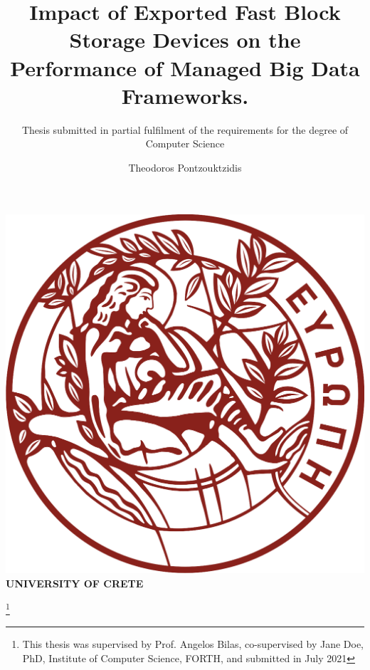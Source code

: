\documentclass[acmsmall,screen,10pt,nonacm]{acmart}
\begin{document}
\begin{center}
\includegraphics[scale=0.2]{figures/UoC_logo.png}\\
\textcolor{UoC}{\textbf{UNIVERSITY OF CRETE}}
\vspace{3em}
\end{center}

\title{Impact of Exported Fast Block Storage Devices on the Performance of Managed Big Data Frameworks.}
\subtitle{Thesis submitted in partial fulfilment of the requirements for the degree of Computer Science}

\thanks{\small{This thesis was supervised by Prof. Angelos Bilas, co-supervised by Jane Doe, PhD, Institute of Computer Science, FORTH, and submitted in July 2021}}

\author{Theodoros Pontzouktzidis}
\end{document}
